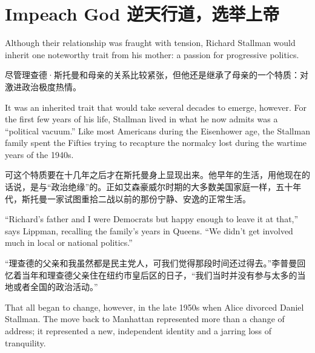 
\chapter{\ifdefined\eng
Impeach God
\fi
\ifdefined\chs
逆天行道，选举上帝
\fi}

\ifdefined\eng
Although their relationship was fraught with tension, Richard Stallman would inherit one noteworthy trait from his mother: a passion for progressive politics.
\fi

\ifdefined\chs
尽管理查德·斯托曼和母亲的关系比较紧张，但他还是继承了母亲的一个特质：对激进政治极度热情。
\fi

\ifdefined\eng
It was an inherited trait that would take several decades to emerge, however. For the first few years of his life, Stallman lived in what he now admits was a ``political vacuum.'' Like most Americans during the Eisenhower age, the Stallman family spent the Fifties trying to recapture the normalcy lost during the wartime years of the 1940s.
\fi

\ifdefined\chs
可这个特质要在十几年之后才在斯托曼身上显现出来。他早年的生活，用他现在的话说，是与“政治绝缘”的。正如艾森豪威尔时期的大多数美国家庭一样，五十年代，斯托曼一家试图重拾二战以前的那份宁静、安逸的正常生活。
\fi

\ifdefined\eng
``Richard's father and I were Democrats but happy enough to leave it at that,'' says Lippman, recalling the family's years in Queens. ``We didn't get involved much in local or national politics.''
\fi

\ifdefined\chs
“理查德的父亲和我虽然都是民主党人，可我们觉得那段时间还过得去。”李普曼回忆着当年和理查德父亲住在纽约市皇后区的日子，“我们当时并没有参与太多的当地或者全国的政治活动。”
\fi

\ifdefined\eng
That all began to change, however, in the late 1950s when Alice divorced Daniel Stallman. The move back to Manhattan represented more than a change of address; it represented a new, independent identity and a jarring loss of tranquility.
\fi

